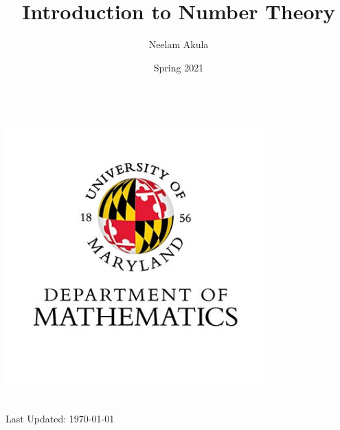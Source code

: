 \documentclass[fullpage]{article}
\title{Introduction to Number Theory}
\author{Neelam Akula}
\date{Spring 2021}
\newif\ifintro
\begin{document}
\makeatletter
    \begin{titlepage}
        \begin{center}
            {\huge \bfseries  \@title }\\[4ex]
			\includegraphics[width=10cm]{logo.png}\\[4ex]
            {\large  \@author}\\[4ex] 
            {\large \@date}
        \end{center}
        \vfill
        Last Updated: \today
    \end{titlepage}
\makeatother

\tableofcontents
\newpage

\ifintro
\section*{Introduction}
\rule{\textwidth}{1pt}
\vspace{1.5in}
\paragraph{}
    This is a compilation of notes and homeworks for MATH 406,
    Introduction to Number Theory, to aid both current and future students
    in fully understanding the material. 
    The primary text used is \emph{Elementary Number Theory}, by Kenneth H. Rosen, 6th
    Edition. While the text is not required it is an excellent resource for additional
    problems. Chapters covered from the text are 1, 3, 4, 6, 7, 9, 8, and 11 in that order. With two
    midterms following chapters 1, 3, 4 and chapters 6, 7, 9. The final is cumulative with an
    emphasis on chapters 8 and 11.
    Lastly, the course is taught by Dr. Justin Wyss-Gallifent, on his personal site there are
    brief versions of each section's lecture notes. A list of his notes can be found
    \href{https://www.math.umd.edu/~immortal/MATH406/}{here}.
\addcontentsline{toc}{section}{Introduction}
\newpage
\fi
\end{document}
